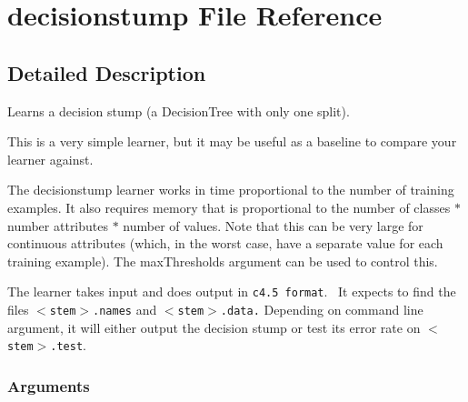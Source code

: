 \section{decisionstump File Reference}
\label{decisionstump}


\subsection{Detailed Description}
Learns a decision stump (a Decision\-Tree with only one split). 

This is a very simple learner, but it may be useful as a baseline to compare your learner against.

The decisionstump learner works in time proportional to the number of training examples. It also requires memory that is proportional to the number of classes $\ast$ number attributes $\ast$ number of values. Note that this can be very large for continuous attributes (which, in the worst case, have a separate value for each training example). The max\-Thresholds argument can be used to control this.

The learner takes input and does output in {\tt c4.5 format}. \  It expects to find the files {\tt $<$stem$>$.names} and {\tt $<$stem$>$.data.} Depending on command line argument, it will either output the decision stump or test its error rate on {\tt $<$stem$>$.test}.

\subsubsection*{Arguments}

